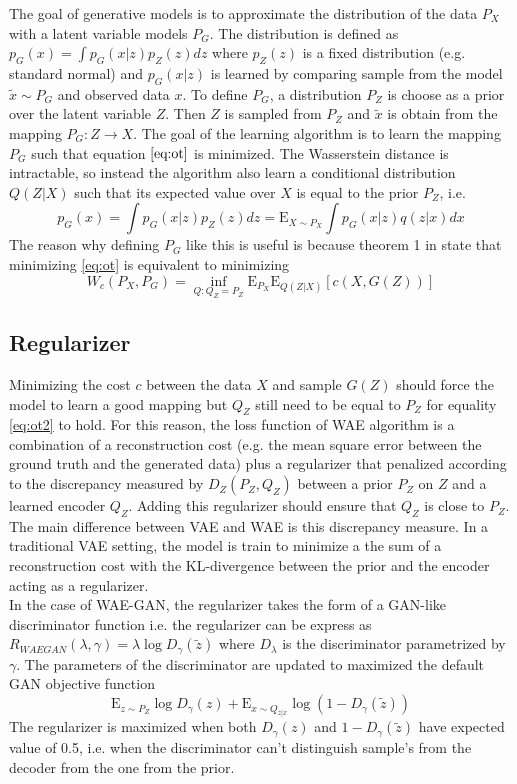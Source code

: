 \documentclass[12pt,english]{amsart}
\newcommand{\E}{\mathrm{E}}
\begin{document}
The goal of generative models is to approximate the distribution of the data $P_X$ with a latent variable models $P_G$. The distribution is defined as $p_G(x) = \int p_G(x|z)p_Z(z)dz$ where $p_Z(z)$ is a fixed distribution (e.g. standard normal) and $p_G(x|z)$ is learned by comparing sample from the model $\tilde{x}\sim P_G$ and observed data $x$. To define $P_G$, a distribution $P_Z$ is choose as a prior over the latent variable $Z$. Then $Z$ is sampled from $P_Z$ and $\tilde{x}$ is obtain from the mapping $P_G: Z \rightarrow X$. The goal of the learning algorithm is to learn the mapping $P_G$ such that equation $\eqref{eq:ot}$ is minimized. The Wasserstein distance is intractable, so instead the algorithm also learn a conditional distribution $Q(Z|X)$ such that its expected value over $X$ is equal to the prior $P_Z$, i.e.
\[
 p_G(x) = \int p_G(x|z)p_Z(z)dz = \E_{X\sim P_X}\int p_G(x|z)q(z|x)dx
\]
The reason why defining $P_G$ like this is useful is because theorem 1 in \cite{2017arXiv171101558T} state that minimizing \eqref{eq:ot} is equivalent to minimizing
\begin{equation}
 W_c(P_X, P_G)=\inf_{Q:Q_Z=P_Z}\E_{P_X}\E_{Q(Z|X)}[c(X, G(Z))]
 \label{eq:ot2}
\end{equation}

\subsection{Regularizer}
Minimizing the cost $c$ between the data $X$ and sample $G(Z)$ should force the model to learn a good mapping but $Q_Z$ still need to be equal to $P_Z$ for equality \eqref{eq:ot2} to hold. For this reason, the loss function of WAE algorithm is a combination of a reconstruction cost (e.g. the mean square error between the ground truth and the generated data) plus a regularizer that penalized according to the discrepancy measured by $D_{Z}(P_Z, Q_Z)$ between a prior $P_Z$ on $Z$ and a learned encoder $Q_Z$. Adding this regularizer should ensure that $Q_Z$ is close to $P_Z$. The main difference between VAE and WAE is this discrepancy measure. In a traditional VAE setting, the model is train to minimize a the sum of a reconstruction cost with the KL-divergence between the prior and the encoder acting as a regularizer. \\

In the case of WAE-GAN, the regularizer takes the form of a GAN-like discriminator function i.e. the regularizer can be express as $R_{WAEGAN}(\lambda, \gamma) = \lambda\log D_{\gamma}(\tilde{z})$ where $D_{\lambda}$ is the discriminator parametrized by $\gamma$. The parameters of the discriminator are updated to maximized the default GAN objective function
\begin{equation}
 \E_{z\sim P_Z}\log D_{\gamma}(z)+\E_{x\sim Q_{z|x}}\log(1-D_{\gamma}(\tilde{z}))
 \label{GAN}
\end{equation}
The regularizer is maximized when both $D_{\gamma}(z)$ and $1-D_{\gamma}(\tilde{z})$ have expected value of 0.5, i.e. when the discriminator can't distinguish sample's from the decoder from the one from the prior. \\
\end{document}
